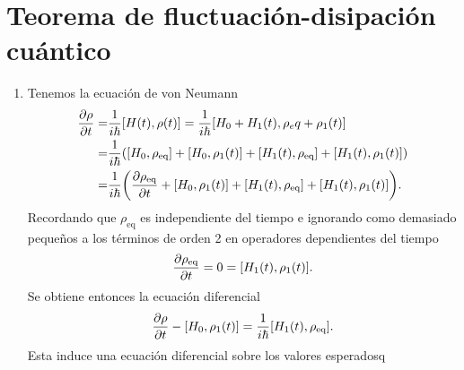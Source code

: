 \documentclass{article}
\begin{document}
\section{Teorema de fluctuación-disipación cuántico}

\begin{enumerate}

\item Tenemos la ecuación de von Neumann
\begin{align}
\begin{split}
\pdv{\rho}{t} (t)=&\frac{1}{i\hbar}[H(t),\rho(t)]=\frac{1}{i\hbar}[H_0+H_1(t),\rho_eq+\rho_1(t)]\\
=&\frac{1}{i\hbar}\qty([H_0,\rho_{\text{eq}}]+[H_0,\rho_1(t)]+[H_1(t),\rho_{\text{eq}}]+[H_1(t),\rho_1(t)])\\
=&\frac{1}{i\hbar}\qty(\pdv{\rho_{\text{eq}}}{t} (t)+[H_0,\rho_1(t)]+[H_1(t),\rho_{\text{eq}}]+[H_1(t),\rho_1(t)]).
\end{split}
\end{align}
Recordando que $\rho_{\text{eq}}$ es independiente del tiempo e ignorando como demasiado pequeños a los términos de orden 2 en operadores dependientes del tiempo
\begin{equation}
\pdv{\rho_{\text{eq}}}{t} (t)=0=[H_1(t),\rho_1(t)].
\end{equation} 
Se obtiene entonces la ecuación diferencial
\begin{equation}
\pdv{\rho}{t} (t)-[H_0,\rho_1(t)]=\frac{1}{i\hbar}[H_1(t),\rho_{\text{eq}}].
\end{equation}
Esta induce una ecuación diferencial sobre los valores esperadosq

\end{enumerate}

%


\end{document}
